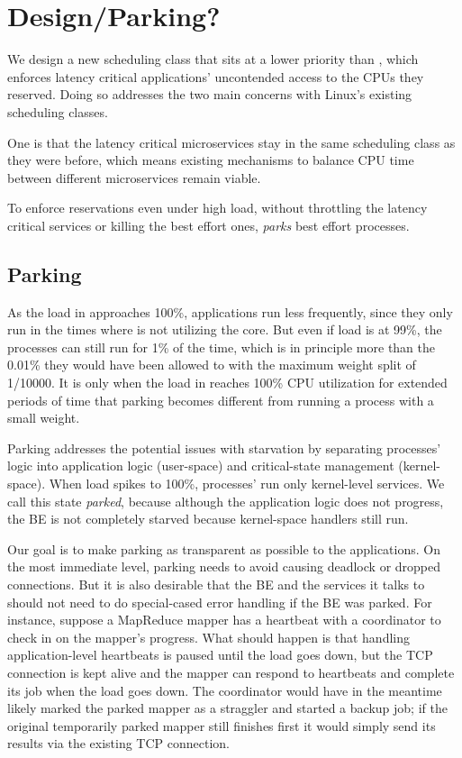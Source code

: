 \section{Design/Parking?}\label{s:design}

We design a new scheduling class \beclass{} that sits at a lower priority than
\normalclass{}, which enforces latency critical applications' uncontended access
to the CPUs they reserved. Doing so addresses the two main concerns with Linux's
existing scheduling classes.

One is that the latency critical microservices stay in the same scheduling class
as they were before, which means existing mechanisms to balance CPU time between
different microservices remain viable.

To enforce reservations even under high load, without throttling the latency
critical services or killing the best effort ones, \beclass{} \textit{parks}
best effort processes.

\subsection{Parking}

As the load in \normalclass{} approaches 100\%, \beclass{} applications run less
frequently, since they only run in the times where \normalclass{} is not
utilizing the core. But even if \normalclass{} load is at 99\%, the \beclass{}
processes can still run for 1\% of the time, which is in principle more than the
0.01\% they would have been allowed to with the maximum weight split of 1/10000.
It is only when the load in \normalclass{} reaches 100\% CPU utilization for
extended periods of time that parking becomes different from running a process
with a small weight.

Parking addresses the potential issues with starvation by separating \beclass{}
processes' logic into application logic (user-space) and critical-state
management (kernel-space). When load spikes to 100\%, \beclass{} processes' run
only kernel-level services. We call this state \textit{parked}, because
although the application logic does not progress, the BE is not completely
starved because kernel-space handlers still run.

Our goal is to make parking as transparent as possible to the applications. On
the most immediate level, parking needs to avoid causing deadlock or dropped
connections. But it is also desirable that the BE and the services it talks to
should not need to do special-cased error handling if the BE was parked. For
instance, suppose a MapReduce mapper has a heartbeat with a coordinator to check
in on the mapper's progress. What should happen is that handling
application-level heartbeats is paused until the load goes down, but the TCP
connection is kept alive and the mapper can respond to heartbeats and complete
its job when the load goes down. The coordinator would have in the meantime
likely marked the parked mapper as a straggler and started a backup job; if the
original temporarily parked mapper still finishes first it would simply send its
results via the existing TCP connection.

